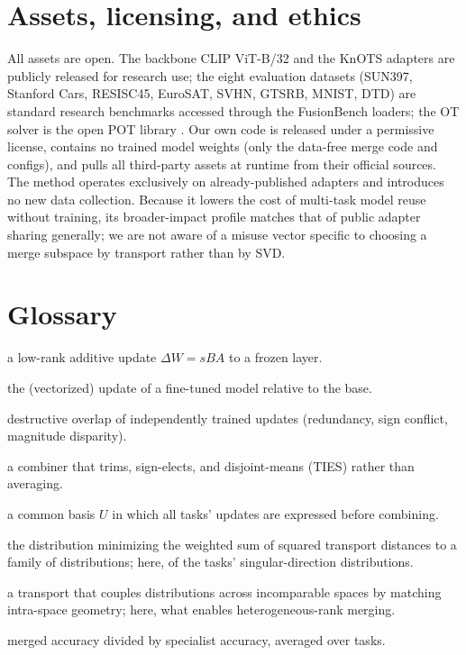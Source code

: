 \documentclass[11pt]{article}
\newcommand{\dW}{\Delta W}
\begin{document}
\section{Assets, licensing, and ethics}
\label{app:assets}
All assets are open. The backbone CLIP ViT-B/32 \citep{radford2021clip} and the KnOTS adapters are
publicly released for research use; the eight evaluation datasets (SUN397, Stanford Cars, RESISC45,
EuroSAT, SVHN, GTSRB, MNIST, DTD) are standard research benchmarks accessed through the FusionBench
\citep{tang2024fusionbench} loaders; the OT solver is the open POT library \citep{flamary2021pot}. Our
own code is released under a permissive license, contains no trained model weights (only the data-free
merge code and configs), and pulls all third-party assets at runtime from their official sources. The
method operates exclusively on already-published adapters and introduces no new data collection. Because
it lowers the cost of multi-task model reuse without training, its broader-impact profile matches that of
public adapter sharing generally; we are not aware of a misuse vector specific to choosing a merge
subspace by transport rather than by SVD.

\section{Glossary}
\label{app:glossary}
\begin{description}[leftmargin=2em,itemsep=1pt]
\item[Adapter / LoRA] a low-rank additive update $\dW=sBA$ to a frozen layer.
\item[Task vector] the (vectorized) update of a fine-tuned model relative to the base.
\item[Interference] destructive overlap of independently trained updates (redundancy, sign conflict,
magnitude disparity).
\item[Interference resolution] a combiner that trims, sign-elects, and disjoint-means (TIES) rather than
averaging.
\item[Shared subspace] a common basis $U$ in which all tasks' updates are expressed before combining.
\item[Wasserstein barycenter] the distribution minimizing the weighted sum of squared transport distances
to a family of distributions; here, of the tasks' singular-direction distributions.
\item[Gromov--Wasserstein] a transport that couples distributions across incomparable spaces by matching
intra-space geometry; here, what enables heterogeneous-rank merging.
\item[Normalized accuracy] merged accuracy divided by specialist accuracy, averaged over tasks.
\end{description}
\end{document}
